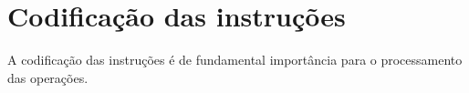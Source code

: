 \section{Codificação das instruções}
	A codificação das instruções é de fundamental importância para o processamento das operações.  %
	
	
	
	